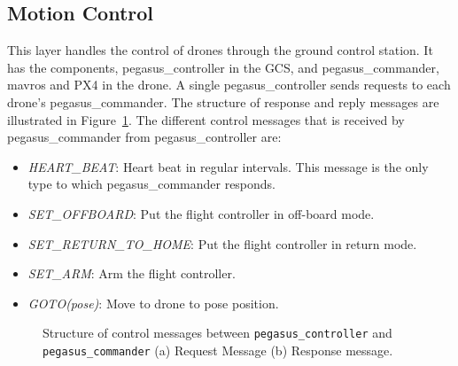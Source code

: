\subsection{Motion Control}

This layer handles the control of drones through the ground control station. It has the components, pegasus\_controller in the GCS, and pegasus\_commander, mavros and PX4 in the drone. A single pegasus\_controller sends requests to each drone's pegasus\_commander. The structure of response and reply messages are illustrated in Figure~\ref{fig:control-messages}. 
The different control messages that is received by pegasus\_commander from pegasus\_controller are:
\begin{itemize}
	\item \textit{HEART\_BEAT}: Heart beat in regular intervals. This message is the only type to which pegasus\_commander responds.
	\item \textit{SET\_OFFBOARD}: Put the flight controller in off-board mode.
	\item \textit{SET\_RETURN\_TO\_HOME}: Put the flight controller in return mode.
	\item \textit{SET\_ARM}: Arm the flight controller.
	\item \textit{GOTO(pose)}: Move to drone to pose position.
\end{itemize}

\begin{figure}
	\centering
	\caption[Structure of control messages.]{\small 
		Structure of control messages between \texttt{pegasus\_controller} and \texttt{pegasus\_commander} (a) Request Message (b) Response message.}
	
	\label{fig:control-messages}
\end{figure}

